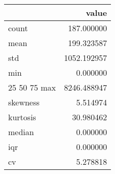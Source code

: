 \begin{tabular}{lr}
\toprule
 & value \\
\midrule
count & 187.000000 \\
mean & 199.323587 \\
std & 1052.192957 \\
min & 0.000000 \\
25%
50%
75%
max & 8246.488947 \\
skewness & 5.514974 \\
kurtosis & 30.980462 \\
median & 0.000000 \\
iqr & 0.000000 \\
cv & 5.278818 \\
\bottomrule
\end{tabular}
